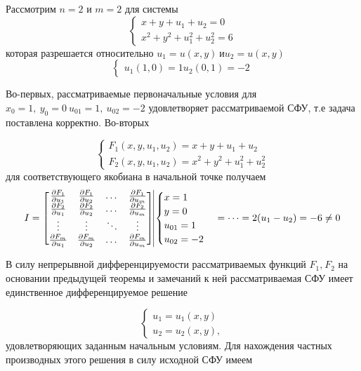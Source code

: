 \documentclass[../../main.tex]{subfiles}
\begin{document}
\begin{exmp}
    Рассмотрим $n = 2$ и $m = 2$ для системы
    \[
    \begin{cases}
        x + y + u_1 + u_2 = 0 \\
        x^2 + y^2 + u_1^2 + u_2^2 = 6
    \end{cases}
    \]
    которая разрешается относительно 
    $u_1 = u\left(x, y\right)\ \text{и}
    u_2 = u\left(x, y\right)$
    \[
    \begin{cases}
        u_1\left(1, 0\right) = 1
        u_2\left(0, 1\right) = -2
    \end{cases}
    \]
    
    Во-первых, рассматриваемые первоначальные условия для
    $x_0 = 1,\ y_0=0\ u_{01} = 1,\ u_{02} = -2$
    удовлетворяет рассматриваемой СФУ, т.е задача 
    поставлена корректно.
    Во-вторых
    
    \[
    \begin{cases}
        F_1(x, y, u_1, u_2) = x + y + u_1 + u_2 \\
        F_2(x, y, u_1, u_2) = x^2 + y^2 + u_1^2 + u_2^2
    \end{cases}     
    \]
    для соответствующего якобиана в начальной точке 
    получаем
    \[
    I = \begin{bmatrix}
        \pderiv{F_1}{u_1} & \pderiv{F_1}{u_2} & \dots & 
        \pderiv{F_1}{u_m} \\
        \pderiv{F_2}{u_1} & \pderiv{F_2}{u_2} &\dots & 
        \pderiv{F_2}{u_m} \\
        \vdots & \vdots & \ddots & \vdots \\
        \pderiv{F_m}{u_1} & \pderiv{F_m}{u_2} & \dots & 
        \pderiv{F_m}{u_m} 
    \end{bmatrix}
    \vline{
    \begin{cases}
        x = 1\\
        y = 0\\
        u_{01} = 1\\
        u_{02} = -2
    \end{cases}
    }{} = \dots =  2(u_1 - u_2) = -6 \neq 0
    \]
    
    В силу непрерывной дифференцируемости рассматриваемых
    функций $F_1\text{,}\ F_2$ на основании
    предыдущей теоремы и замечаний к ней 
    рассматриваемая СФУ имеет единственное 
    дифференцируемое решение
    
    \[
    \begin{cases}
        u_1 = u_1\left(x, y\right) \\
        u_2 = u_2\left(x, y\right), 
    \end{cases} 
    \]
    удовлетворяющих заданным начальным условиям.
    Для нахождения частных производных этого решения 
    в силу исходной СФУ имеем
    

\end{exmp}
\end{document}
